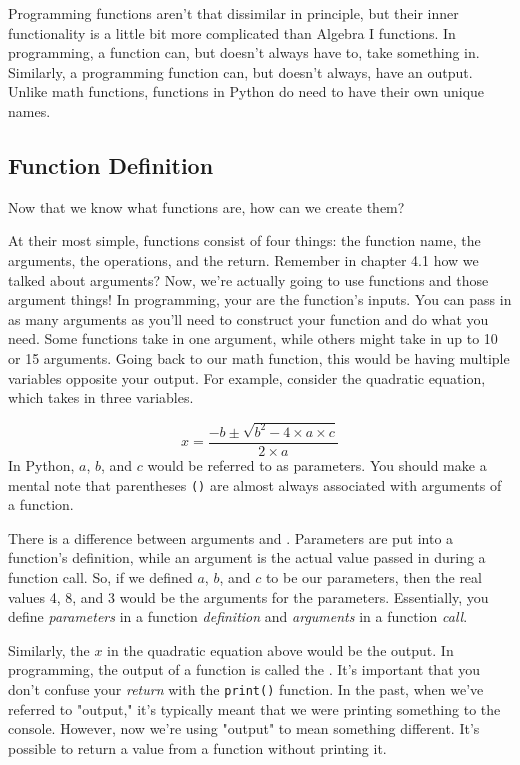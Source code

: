 Programming functions aren't that dissimilar in principle, but their inner functionality is a little bit more complicated than Algebra I functions. In programming, a function can, but doesn't always have to, take something in. Similarly, a programming function can, but doesn't always, have an output. Unlike math functions, functions in Python do need to have their own unique names.\par
\subsection{Function Definition}
Now that we know what functions are, how can we create them?\par
At their most simple, functions consist of four things: the function name, the arguments, the operations, and the return. Remember in chapter 4.1 how we talked about arguments? Now, we're actually going to use functions and those argument things! In programming, your  are the function's inputs. You can pass in as many arguments as you'll need to construct your function and do what you need. Some functions take in one argument, while others might take in up to 10 or 15 arguments. Going back to our math function, this would be having multiple variables opposite your output. For example, consider the quadratic equation, which takes in three variables.\par
$$
x = \frac{-b \pm \sqrt{b^{2} - 4 \times a \times c}}{2 \times a}
$$
In Python, $a$, $b$, and $c$ would be referred to as parameters. You should make a mental note that parentheses \verb|()| are almost always associated with arguments of a function.\par
There is a difference between arguments and . Parameters are put into a function's definition, while an argument is the actual value passed in during a function call. So, if we defined $a$, $b$, and $c$ to be our parameters, then the real values 4, 8, and 3 would be the arguments for the parameters. Essentially, you define \textit{parameters} in a function \textit{definition} and \textit{arguments} in a function \textit{call}.\par
Similarly, the $x$ in the quadratic equation above would be the output. In programming, the output of a function is called the . It's important that you don't confuse your \textit{return} with the \verb|print()| function. In the past, when we've referred to "output," it's typically meant that we were printing something to the console. However, now we're using "output" to mean something different. It's possible to return a value from a function without printing it.\par
